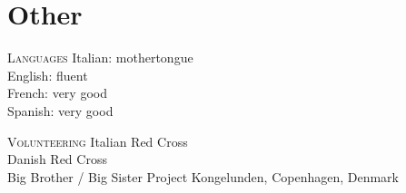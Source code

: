 \section*{Other}

\begin{paracol}{2}
  \textsc{Languages}
\switchcolumn
  Italian: mothertongue\\
  English: fluent\\
  French: very good\\
  Spanish: very good
\end{paracol}

\begin{paracol}{2}
  \textsc{Volunteering}
\switchcolumn
  Italian Red Cross\\
  Danish Red Cross\\
  Big Brother / Big Sister Project Kongelunden, Copenhagen, Denmark
\end{paracol}